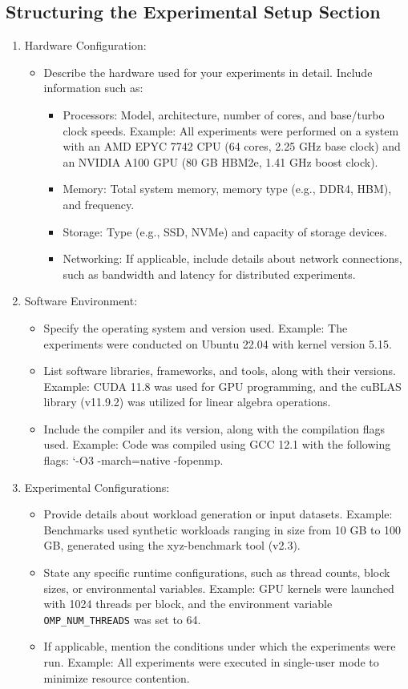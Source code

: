 \documentclass[conference]{IEEEtran}
\begin{document}
\subsection{Structuring the Experimental Setup Section}
\begin{enumerate}
\item Hardware Configuration:  
\begin{itemize}
   \item Describe the hardware used for your experiments in detail. Include information such as:  
\begin{itemize}
     \item Processors: Model, architecture, number of cores, and base/turbo clock speeds. Example: All experiments were performed on a system with an AMD EPYC 7742 CPU (64 cores, 2.25 GHz base clock) and an NVIDIA A100 GPU (80 GB HBM2e, 1.41 GHz boost clock).
     \item Memory: Total system memory, memory type (e.g., DDR4, HBM), and frequency.  
     \item Storage: Type (e.g., SSD, NVMe) and capacity of storage devices.  
     \item Networking: If applicable, include details about network connections, such as bandwidth and latency for distributed experiments.  
\end{itemize}
\end{itemize}

\item Software Environment:  
\begin{itemize}
   \item Specify the operating system and version used. Example: The experiments were conducted on Ubuntu 22.04 with kernel version 5.15.  
   \item List software libraries, frameworks, and tools, along with their versions. Example: CUDA 11.8 was used for GPU programming, and the cuBLAS library (v11.9.2) was utilized for linear algebra operations.  
   \item Include the compiler and its version, along with the compilation flags used. Example: Code was compiled using GCC 12.1 with the following flags: `-O3 -march=native -fopenmp. 
\end{itemize}

\item Experimental Configurations:  
\begin{itemize}
   \item Provide details about workload generation or input datasets. Example: Benchmarks used synthetic workloads ranging in size from 10 GB to 100 GB, generated using the xyz-benchmark tool (v2.3).  
   \item State any specific runtime configurations, such as thread counts, block sizes, or environmental variables. Example: GPU kernels were launched with 1024 threads per block, and the environment variable \verb|OMP_NUM_THREADS| was set to 64.
   \item If applicable, mention the conditions under which the experiments were run. Example: All experiments were executed in single-user mode to minimize resource contention.
\end{itemize}


\end{enumerate}
\end{document}
